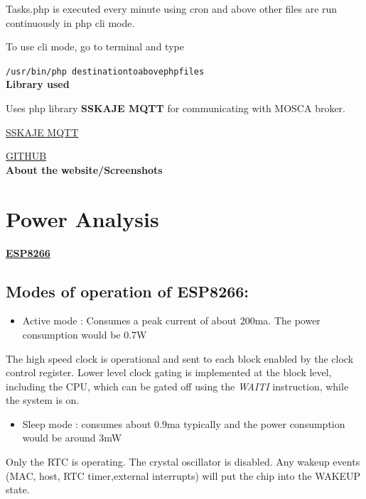 \documentclass[16pt]{article}
\begin{document}
Tasks.php is executed every minute using cron and above other files are
run continuously in php cli mode.

To use cli mode, go to terminal and type

\texttt{/usr/bin/php destinationtoabovephpfiles}\\

\textbf{Library used}

Uses php library \textbf{SSKAJE MQTT} for communicating with MOSCA
broker.

\href{https://sskaje.me}{SSKAJE MQTT}

\href{https://github.com/sskaje/mqtt}{GITHUB}\\
\textbf{About the website/Screenshots}



\vspace{13cm}

\section{Power Analysis}
\vspace{0.5cm}

{\Large{\underline{\textbf{ESP8266}}}}

\vspace{0.2cm}

\subsection{Modes of operation of
ESP8266:}

\begin{itemize}

\item
  Active mode : Consumes a peak current of about 200ma. The power
  consumption would be 0.7W
\end{itemize}

The high speed clock is operational and sent to each block enabled by
the clock control register. Lower level clock gating is implemented at
the block level, including the CPU, which can be gated off using the
\emph{WAITI} instruction, while the system is on.

\begin{itemize}

\item
  Sleep mode : consumes about 0.9ma typically and the power consumption
  would be around 3mW
\end{itemize}

Only the RTC is operating. The crystal oscillator is disabled. Any
wakeup events (MAC, host, RTC timer,external interrupts) will put the
chip into the WAKEUP state.
\end{document}
